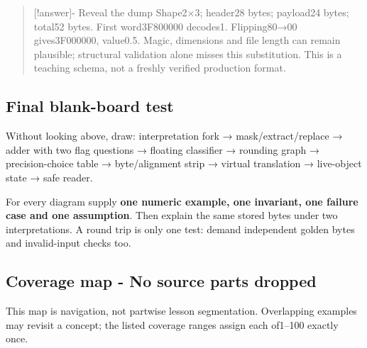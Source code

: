 \begin{quote}
{[}!answer{]}- Reveal the dump Shape2×3; header28 bytes; payload24 bytes; total52 bytes. First word3F800000 decodes1. Flipping80→00 gives3F000000, value0.5. Magic, dimensions and file length can remain plausible; structural validation alone misses this substitution. This is a teaching schema, not a freshly verified production format.
\end{quote}

\subsection{Final blank-board test}\label{appendix-ef4d27797a92-final-blank-board-test}

\hypertarget{appendix-ef4d27797a92-final-blank-board-test}{}

Without looking above, draw: interpretation fork → mask/extract/replace → adder with two flag questions → floating classifier → rounding graph → precision-choice table → byte/alignment strip → virtual translation → live-object state → safe reader.

For every diagram supply \textbf{one numeric example, one invariant, one failure case and one assumption}. Then explain the same stored bytes under two interpretations. A round trip is only one test: demand independent golden bytes and invalid-input checks too.

\subsection{Coverage map - No source parts dropped}\label{appendix-ef4d27797a92-coverage-map---no-source-parts-dropped}

\hypertarget{appendix-ef4d27797a92-coverage-map---no-source-parts-dropped}{}

This map is navigation, not partwise lesson segmentation. Overlapping examples may revisit a concept; the listed coverage ranges assign each of1--100 exactly once.

